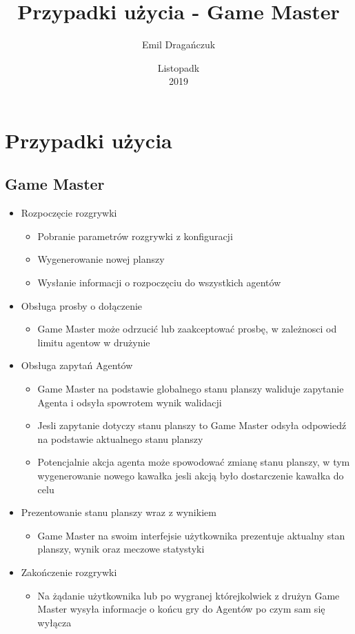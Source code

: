 \documentclass[a4paper]{article}
\title{Przypadki użycia - Game Master}
\date{Listopadk\\2019}
\author{Emil Dragańczuk}
\begin{document}
\maketitle
\section{}
\section{Przypadki użycia}
\subsection{Game Master}
\begin{itemize}
	\item Rozpoczęcie rozgrywki
	\begin{itemize}
		\item Pobranie parametrów rozgrywki z konfiguracji
		\item Wygenerowanie nowej planszy
		\item Wysłanie informacji o rozpoczęciu do wszystkich agentów
	\end{itemize}
	\item Obsługa prosby o dołączenie
	\begin{itemize}
		\item Game Master może odrzucić lub zaakceptować prosbę, w zależnosci od limitu agentow w drużynie
	\end{itemize}
	\item Obsługa zapytań Agentów
	\begin{itemize}
		\item Game Master na podstawie globalnego stanu planszy waliduje zapytanie Agenta i odsyła spowrotem wynik walidacji
		\item Jesli zapytanie dotyczy stanu planszy to Game Master odsyła odpowiedź na podstawie aktualnego stanu planszy
		\item Potencjalnie akcja agenta może spowodować zmianę stanu planszy, w tym wygenerowanie nowego kawałka jesli akcją było dostarczenie kawałka do celu
	\end{itemize}
	\item Prezentowanie stanu planszy wraz z wynikiem
	\begin{itemize}
		\item Game Master na swoim interfejsie użytkownika prezentuje aktualny stan planszy, wynik oraz meczowe statystyki
	\end{itemize}
	\item Zakończenie rozgrywki
	\begin{itemize}
		\item Na żądanie użytkownika lub po wygranej którejkolwiek z drużyn Game Master wysyła informacje o końcu gry do Agentów po czym sam się wyłącza
	\end{itemize}
\end{itemize}
\end{document}
